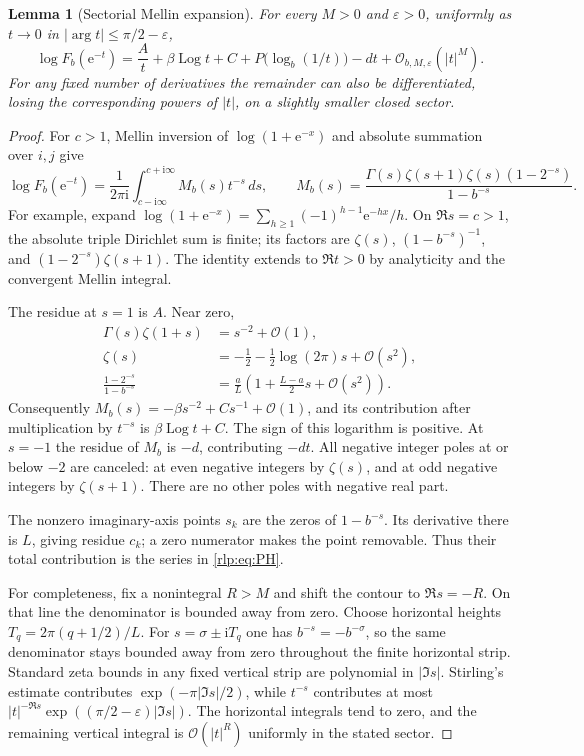 \documentclass[11pt,letterpaper]{article}
\numberwithin{equation}{section}
\newtheorem{lemma}[theorem]{Lemma}
\theoremstyle{remark}\newtheorem{remark}[theorem]{Remark}
\newcommand{\ii}{\mathrm i}
\newcommand{\ee}{\mathrm e}
\newcommand{\Ord}{\mathcal O}
\newcommand{\Log}{\operatorname{Log}}
\begin{document}
\begin{lemma}[Sectorial Mellin expansion]\label{rlp:lem:mellin}
For every $M>0$ and $\varepsilon>0$, uniformly as $t\to0$ in
$|\arg t|\le\pi/2-\varepsilon$,
\begin{equation}\label{rlp:eq:mellinexp}
 \log F_b(\ee^{-t})=
 \frac At+\beta\Log t+C+P\bigl(\log_b(1/t)\bigr)-dt
 +\Ord_{b,M,\varepsilon}(|t|^M).
\end{equation}
For any fixed number of derivatives the remainder can also be differentiated, losing the corresponding powers of $|t|$, on a slightly smaller closed sector.
\end{lemma}
\begin{proof}
For $c>1$, Mellin inversion of $\log(1+\ee^{-x})$ and absolute summation over $i,j$ give
\begin{equation}\label{rlp:eq:mellinintegral}
 \log F_b(\ee^{-t})=
 \frac1{2\pi\ii}\int_{c-\ii\infty}^{c+\ii\infty}M_b(s)t^{-s}\,ds,
 \qquad
 M_b(s)=\frac{\Gamma(s)\zeta(s+1)\zeta(s)(1-2^{-s})}{1-b^{-s}}.
\end{equation}
For example, expand $\log(1+\ee^{-x})=\sum_{h\ge1}(-1)^{h-1}\ee^{-hx}/h$. On $\Re s=c>1$, the absolute triple Dirichlet sum is finite; its factors are $\zeta(s)$, $(1-b^{-s})^{-1}$, and $(1-2^{-s})\zeta(s+1)$. The identity extends to $\Re t>0$ by analyticity and the convergent Mellin integral.

The residue at $s=1$ is $A$. Near zero,
\begin{align*}
 \Gamma(s)\zeta(1+s)&=s^{-2}+\Ord(1),\\
 \zeta(s)&=-\tfrac12-\tfrac12\log(2\pi)s+\Ord(s^2),\\
 \frac{1-2^{-s}}{1-b^{-s}}
 &=\frac aL\left(1+\frac{L-a}{2}s+\Ord(s^2)\right).
\end{align*}
Consequently $M_b(s)=-\beta s^{-2}+Cs^{-1}+\Ord(1)$, and its contribution after multiplication by $t^{-s}$ is $\beta\Log t+C$. The sign of this logarithm is positive. At $s=-1$ the residue of $M_b$ is $-d$, contributing $-dt$. All negative integer poles at or below $-2$ are canceled: at even negative integers by $\zeta(s)$, and at odd negative integers by $\zeta(s+1)$. There are no other poles with negative real part.

The nonzero imaginary-axis points $s_k$ are the zeros of $1-b^{-s}$. Its derivative there is $L$, giving residue $c_k$; a zero numerator makes the point removable. Thus their total contribution is the series in \eqref{rlp:eq:PH}.

For completeness, fix a nonintegral $R>M$ and shift the contour to $\Re s=-R$. On that line the denominator is bounded away from zero. Choose horizontal heights
$T_q=2\pi(q+1/2)/L$. For $s=\sigma\pm\ii T_q$ one has $b^{-s}=-b^{-\sigma}$, so the same denominator stays bounded away from zero throughout the finite horizontal strip. Standard zeta bounds in any fixed vertical strip are polynomial in $|\Im s|$. Stirling's estimate contributes $\exp(-\pi|\Im s|/2)$, while $t^{-s}$ contributes at most $|t|^{-\Re s}\exp((\pi/2-\varepsilon)|\Im s|)$. The horizontal integrals tend to zero, and the remaining vertical integral is $\Ord(|t|^R)$ uniformly in the stated sector.


\end{proof}
\end{document}
